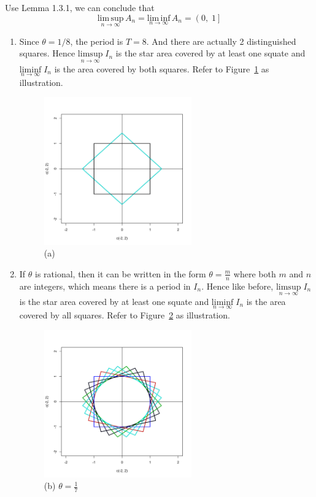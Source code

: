 \begin{list}{1.9.}{}
\item
  Use Lemma 1.3.1, we can conclude that
  \[
    \underset{n\to\infty}{\mathrm{lim\,sup}}\,A_n = \underset{n\to\infty}{\mathrm{lim\,inf}}\,A_n
    = \left(0,\;1\right]
  \]
\item 
  \begin{enumerate}
  \item Since $\theta = 1/8 $, the period is $T=8$. And there are actually 2 distinguished squares. Hence $ \underset{n\to\infty}{\mathrm{limsup}}\;I_n$ is the star area covered by at least one squate and $ \underset{n\to\infty}{\mathrm{liminf}}\;I_n$ is the area covered by both squares. Refer to Figure~\ref{fig:1.9.7.a} as illustration.
    \begin{figure}[htbp]
      \centering
      \includegraphics[width=0.6\textwidth]{./Figures/1_9_7_a.pdf}
      \caption{(a)}
      \label{fig:1.9.7.a}
    \end{figure}

  \item If $\theta$ is rational, then it can be written in the form $\theta = \frac{m}{n}$ where both $m$ and $n$ are integers, which means there is a period in $I_n$. Hence like before, $ \underset{n\to\infty}{\mathrm{limsup}}\;I_n$ is the star area covered by at least one squate and $ \underset{n\to\infty}{\mathrm{liminf}}\;I_n$ is the area covered by all squares. Refer to Figure~\ref{fig:1.9.7.b} as illustration.
    \begin{figure}[htbp]
      \centering
      \includegraphics[width=0.6\textwidth]{./Figures/1_9_7_b.pdf}
      \caption{(b) $\theta = \frac{1}{7}$}
      \label{fig:1.9.7.b}
    \end{figure}
    

\end{enumerate}
\end{list}
